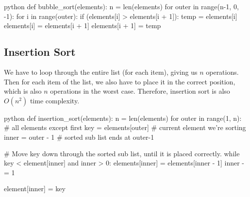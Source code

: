 \begin{code}{python}
    def bubble_sort(elements):
        n = len(elements)
        for outer in range(n-1, 0, -1):
            for i in range(outer):
                if (elements[i] > elements[i + 1]):
                    temp = elements[i]
                    elements[i] = elements[i + 1]
                    elements[i + 1] = temp
\end{code}

\subsection{Insertion Sort}\label{sub:insertion_sort}

We have to loop through the entire list (for each item), giving us \(n\) operations.
Then for each item of the list, we also have to place it in the correct position, which is also \(n\) operations in the worst case.
Therefore, insertion sort is also \(O(n^2)\) time complexity.

\begin{code}{python}
    def insertion_sort(elements):
        n = len(elements)
        for outer in range(1, n):  # all elements except first
            key = elements[outer]  # current element we're sorting
            inner = outer - 1  # sorted sub list ends at outer-1

            # Move key down through the sorted sub list, until it is placed correctly.
            while key < element[inner] and inner > 0:
                elements[inner] = elements[inner - 1]
                inner -= 1

            element[inner] = key
\end{code}
